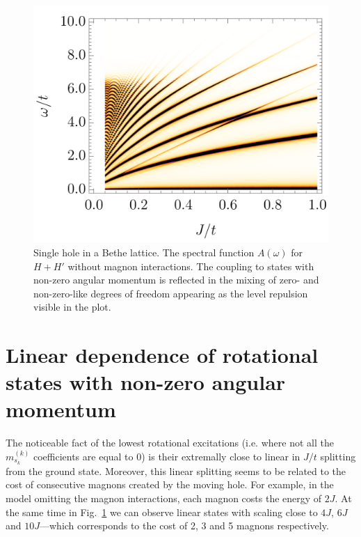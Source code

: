 \documentclass[11pt, a4paper, onecolumn]{article}
\begin{document}
\begin{figure}[h!]
	\includegraphics[width=0.79\columnwidth]
	{./figures/bethe_acr.png}
	\caption{
		Single hole in a Bethe lattice. The spectral function $A(\omega)$ for $H + H'$ without magnon interactions. The coupling to states with non-zero angular momentum is reflected in the mixing of zero- and non-zero-like degrees of freedom appearing as the level repulsion visible in the plot.
	}\label{fig:crossing}
\end{figure}

\clearpage

\section{Linear dependence of rotational states with non-zero angular momentum}
The noticeable fact of the lowest rotational excitations (i.e. where not all the $m^{(k)}_{s_k}$ coefficients are equal to 0) is their extremally close to linear in $J/t$ splitting from the ground state. Moreover, this linear splitting seems to be related to the cost of consecutive magnons created by the moving hole. For example, in the model omitting the magnon interactions, each magnon costs the energy of $2J$. At the same time in Fig.~\ref{fig:crossing} we can observe linear states with scaling close to $4J$, $6J$ and $10J$---which corresponds to the cost of 2, 3 and 5 magnons respectively.
\end{document}
